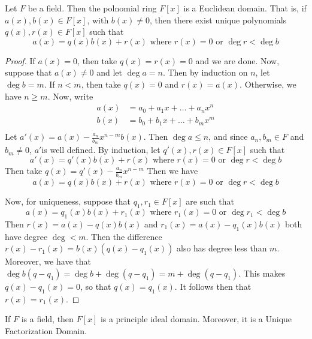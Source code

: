 
\begin{theorem}\label{3.2.1}
    Let $F$ be a field. Then the polnomial ring $F[x]$ is a Euclidean domain.
    That is, if $a(x),b(x) \in F[x]$, with $b(x) \neq 0$, then there exist
    unique polynomials $q(x), r(x) \in F[x]$ such that
    \begin{equation*}
        a(x)=q(x)b(x)+r(x) \text{ where } r(x)=0 \text{ or } \deg{r}<\deg{b}
    \end{equation*}
\end{theorem}
\begin{proof}
    If $a(x)=0$, then take $q(x)=r(x)=0$ and we are done. Now, suppose that
    $a(x) \neq 0$ and let $\deg{a}=n$. Then by induction on $n$, let
    $\deg{b}=m$. If $n<m$, then take  $q(x)=0$ and $r(x)=a(x)$. Otherwise, we
    have $n \geq m$. Now, write
    \begin{align*}
        a(x)    &=  a_0+a_1x+\dots+a_nx^n   \\
        b(x)    &=  b_0+b_1x+\dots+b_mx^m   \\
    \end{align*}
    Let $a'(x)=a(x)-\frac{a_n}{b_m}x^{n-m}b(x)$. Then $\deg{a} \leq n$, and
    since $a_n,b_m \in F$ and  $b_m \neq 0$,  $a'$is well defined. By induction,
    let  $q'(x),r(x) \in F[x]$ such that
    \begin{equation*}
        a'(x)=q'(x)b(x)+r(x) \text{ where } r(x)=0 \text{ or } \deg{r}<\deg{b}
    \end{equation*}
    Then take $q(x)=q'(x)-\frac{a_n}{b_m}x^{n-m}$ Then we have
    \begin{equation*}
        a(x)=q(x)b(x)+r(x) \text{ where } r(x)=0 \text{ or } \deg{r}<\deg{b}
    \end{equation*}

    Now, for uniqueness, suppose that $q_1,r_1 \in F[x]$ are such that
    \begin{equation*}
        a(x)=q_1(x)b(x)+r_1(x) \text{ where } r_1(x)=0 \text{ or } \deg{r_1}<\deg{b}
    \end{equation*}
    Then $r(x)=a(x)-q(x)b(x)$ and $r_1(x)=a(x)-q_1(x)b(x)$ both have degree
    $\deg<m$. Then the difference  $r(x)-r_1(x)=b(x)(q(x)-q_1(x))$ also has
    degree less than $m$. Moreover, we have that
    $\deg{b(q-q_1)}=\deg{b}+\deg{(q-q_1)}=m+\deg{(q-q_1)}$. This makes
    $q(x)-q_1(x)=0$, so that $q(x)=q_1(x)$. It follows then that $r(x)=r_1(x)$.
\end{proof}
\begin{corollary}
    If $F$ is a field, then $F[x]$ is a principle ideal domain. Moreover, it is
    a Unique Factorization Domain.
\end{corollary}

